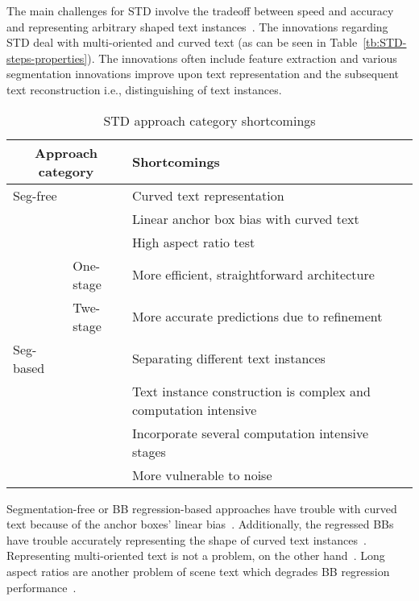 The main challenges for \ac{STD} involve the tradeoff between speed and accuracy and
representing arbitrary shaped text instances~\citep{wang_efficient_2019}.
The innovations regarding \ac{STD} deal with multi-oriented and curved text (as can be seen in
Table~\ref{tb:STD-steps-properties}).
The innovations often include feature extraction and various segmentation innovations improve upon
text representation and the subsequent text reconstruction i.e., distinguishing of text instances.
\begin{table}[h]
    \centering\scriptsize
    \begin{tabular}{p{}p{}p{}}
        \multicolumn{2}{c}{\textbf{Approach category}} & \textbf{Shortcomings} \\
        \toprule
        Seg-free & & Curved text representation~\citep{long_scene_2021,wang_shape_2019} \\
        & & Linear anchor box bias with curved text~\citep{wang_shape_2019,ferrari_textsnake_2018} \\
        & & High aspect ratio test~\citep{shi_detecting_2017,long_scene_2021} \\
        & One-stage & More efficient, straightforward architecture~\citep{lu_mimicdet_2020} \\
        & Twe-stage & More accurate predictions due to refinement~\citep{lu_mimicdet_2020} \\
        \midrule
        Seg-based & & Separating different text instances~\citep{wang_shape_2019} \\
        & & Text instance construction is complex and computation
            intensive~\citep{xie_aggregation_2019,liao_real-time_2019,qiao_text_2021} \\
        & & Incorporate several computation intensive stages~\citep{dai_fused_2018} \\
        & & More vulnerable to noise~\citep{long_scene_2021} \\
        \bottomrule
    \end{tabular}
    \caption{STD approach category shortcomings\label{tb:STD-shortcomings}}
\end{table}

Segmentation-free or \ac{BB} regression-based approaches have trouble with curved text because of
the anchor boxes' linear bias~\citep{wang_shape_2019,ferrari_textsnake_2018}.
Additionally, the regressed \acp{BB} have trouble accurately representing the shape of curved
text instances~\citep{long_scene_2021,wang_shape_2019}.
Representing multi-oriented text is not a problem, on the other
hand~\citep{liao_textboxes_2018,jiang_r2cnn_2017}.
Long aspect ratios are another problem of scene text which degrades \ac{BB} regression
performance~\citep{shi_detecting_2017,long_scene_2021}.


